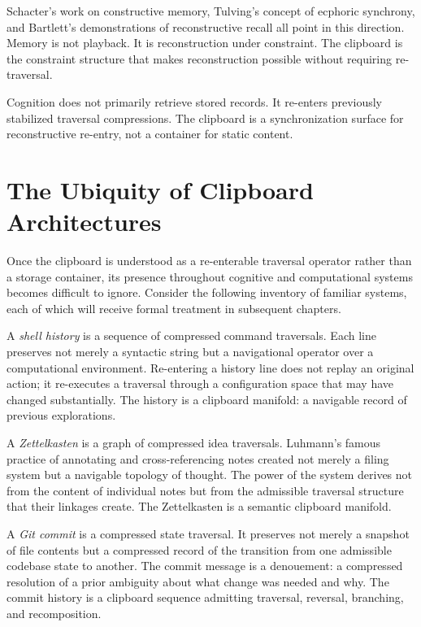 \documentclass[12pt,oneside]{book}
\newcounter{thesisctr}
\newenvironment{thesis}[1][]{%
  \refstepcounter{thesisctr}%
  \begin{tcolorbox}[
    enhanced,
    breakable,
    colback=cliplight,
    colframe=clipblue,
    fonttitle=\bfseries\small,
    title={Thesis~\thethesisctr\ifx&#1&\else~(#1)\fi},
    left=6pt, right=6pt, top=4pt, bottom=4pt,
    arc=2pt
  ]
}{%
  \end{tcolorbox}
}
\theoremstyle{plain}
\theoremstyle{definition}
\theoremstyle{plain}
\begin{document}
Schacter's work on constructive memory, Tulving's concept of ecphoric synchrony, and Bartlett's demonstrations of reconstructive recall all point in this direction. Memory is not playback. It is reconstruction under constraint. The clipboard is the constraint structure that makes reconstruction possible without requiring re-traversal.

\begin{thesis}[Against Storage]
Cognition does not primarily retrieve stored records. It re-enters previously stabilized traversal compressions. The clipboard is a synchronization surface for reconstructive re-entry, not a container for static content.
\end{thesis}

\section{The Ubiquity of Clipboard Architectures}

Once the clipboard is understood as a re-enterable traversal operator rather than a storage container, its presence throughout cognitive and computational systems becomes difficult to ignore. Consider the following inventory of familiar systems, each of which will receive formal treatment in subsequent chapters.

A \emph{shell history} is a sequence of compressed command traversals. Each line preserves not merely a syntactic string but a navigational operator over a computational environment. Re-entering a history line does not replay an original action; it re-executes a traversal through a configuration space that may have changed substantially. The history is a clipboard manifold: a navigable record of previous explorations.

A \emph{Zettelkasten} is a graph of compressed idea traversals. Luhmann's famous practice of annotating and cross-referencing notes created not merely a filing system but a navigable topology of thought. The power of the system derives not from the content of individual notes but from the admissible traversal structure that their linkages create. The Zettelkasten is a semantic clipboard manifold.

A \emph{Git commit} is a compressed state traversal. It preserves not merely a snapshot of file contents but a compressed record of the transition from one admissible codebase state to another. The commit message is a denouement: a compressed resolution of a prior ambiguity about what change was needed and why. The commit history is a clipboard sequence admitting traversal, reversal, branching, and recomposition.
\end{document}
